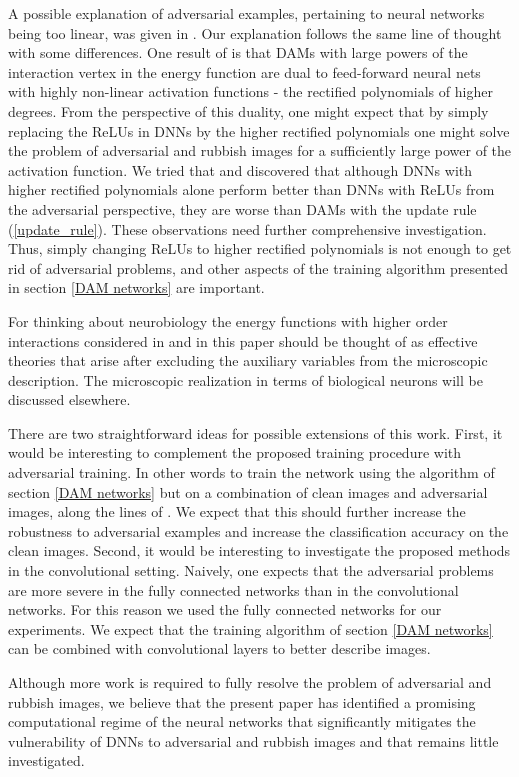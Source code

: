 \documentclass[12pt]{article} %
\begin{document}
A possible explanation of adversarial examples, pertaining to neural networks being too linear, was given in \cite{sign gradient}. Our explanation follows the same line of thought with some differences. One result of \cite{Krotov Hopfield} is that DAMs with large powers of the interaction vertex in the energy function are dual to feed-forward neural nets with highly non-linear activation functions - the rectified polynomials of higher degrees. From the perspective of this duality, one might expect that by simply replacing the ReLUs in DNNs by the higher rectified polynomials one might solve the problem of adversarial and rubbish images for a sufficiently large power of the activation function. We tried that and discovered that although DNNs with higher rectified polynomials alone perform better than DNNs with ReLUs from the adversarial perspective, they are worse than DAMs with the update rule (\ref{update_rule}). These observations need further comprehensive investigation. Thus, simply changing ReLUs to higher rectified polynomials is not enough to get rid of adversarial problems, and other aspects of the training algorithm presented in section \ref{DAM networks} are important. 

For thinking about neurobiology the energy functions with higher order interactions considered in \cite{Krotov Hopfield} and in this paper should be thought of as effective theories that arise after excluding the auxiliary variables from the microscopic description. The microscopic realization in terms of biological neurons will be discussed elsewhere. 

There are two straightforward ideas for possible extensions of this work. First, it would be interesting to complement the proposed training procedure with adversarial training. In other words to train the network using the algorithm of section \ref{DAM networks} but on a combination of clean images and adversarial images, along the lines of \cite{Nokland,sign gradient}.  We expect that this should further increase the robustness to adversarial examples and increase the classification accuracy on the clean images. Second, it would be interesting to investigate the proposed methods in the convolutional setting. Naively, one expects that the adversarial problems are more severe in the fully connected networks than in the convolutional networks. For this reason we used the fully connected networks for our experiments. We expect that the training algorithm of section \ref{DAM networks} can be combined with convolutional layers to better describe images.  

Although more work is required to fully resolve the problem of adversarial and rubbish images, we believe that the present paper has identified a promising computational regime of the neural networks that significantly mitigates the vulnerability of DNNs to adversarial and rubbish images and that remains little investigated.







\end{document}

